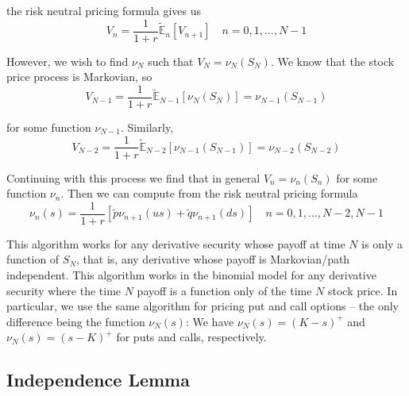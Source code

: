 \documentclass[12pt]{article}
\newlength\tindent
\renewcommand{\indent}{\hspace*{\tindent}}
\newcommand{\E}{\mathbb E}
\begin{document}
the risk neutral pricing formula gives us
\begin{equation*}
	V_n = \frac{1}{1 + r} \tilde{\E}_n[V_{n + 1}] \quad n = 0, 1,..., N - 1
\end{equation*}

\indent However, we wish to find $\nu_N$ such that $V_N = \nu_N(S_N)$. We know that the stock price process is Markovian, so
\begin{equation*}
	V_{N - 1} = \frac{1}{1 + r} \tilde{\E}_{N - 1} \left[ \nu_N(S_N) \right] = \nu_{N - 1}(S_{N - 1})
\end{equation*}

for some function $\nu_{N - 1}$. Similarly,
\begin{equation*}
	V_{N - 2} = \frac{1}{1 + r} \tilde{\E}_{N - 2} \left[ \nu_{N - 1}(S_{N - 1}) \right] = \nu_{N - 2}(S_{N - 2})
\end{equation*}

\indent Continuing with this process we find that in general $V_n = \nu_n(S_n)$ for some function $\nu_n$. Then we can compute from the risk neutral pricing formula
\begin{equation*}
	\nu_n(s) = \frac{1}{1 + r} \left[ \tilde{p} \nu_{n + 1}(us) + \tilde{q}\nu_{n + 1}(ds) \right] \quad n = 0, 1, ..., N - 2, N - 1
\end{equation*}

\indent This algorithm works for any derivative security whose payoff at time $N$ is only a function of $S_N$, that is, any derivative whose payoff is Markovian/path independent. This algorithm works in the binomial model for any derivative security where the time $N$ payoff is a function only of the time $N$ stock price. In particular, we use the same algorithm for pricing put and call options -- the only difference being the function $\nu_N(s)$: We have $\nu_N(s) = (K - s)^+$ and $\nu_N(s) = (s - K)^+$ for puts and calls, respectively.

\subsection{Independence Lemma}
\end{document}
